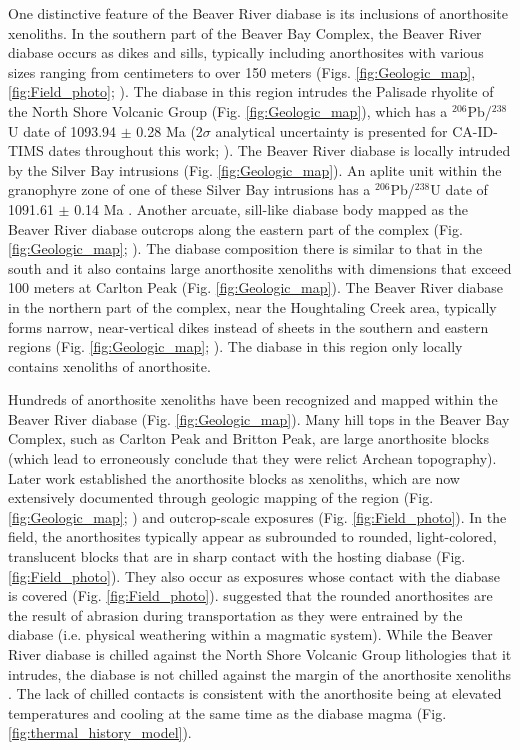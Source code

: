 \documentclass[draft]{agujournal2019}
\begin{document}
One distinctive feature of the Beaver River diabase is its inclusions of anorthosite xenoliths. In the southern part of the Beaver Bay Complex, the Beaver River diabase occurs as dikes and sills, typically including anorthosites with various sizes ranging from centimeters to over 150 meters (Figs. \ref{fig:Geologic_map}, \ref{fig:Field_photo}; ). The diabase in this region intrudes the Palisade rhyolite of the North Shore Volcanic Group (Fig. \ref{fig:Geologic_map}), which has a $^{206}$Pb/$^{238}$U date of 1093.94 $\pm$ 0.28 Ma (2$\sigma$ analytical uncertainty is presented for CA-ID-TIMS dates throughout this work; ). The Beaver River diabase is locally intruded by the Silver Bay intrusions (Fig. \ref{fig:Geologic_map}). An aplite unit within the granophyre zone of one of these Silver Bay intrusions has a $^{206}$Pb/$^{238}$U date of 1091.61 $\pm$ 0.14 Ma \cite{Swanson-Hysell2019a}. Another arcuate, sill-like diabase body mapped as the Beaver River diabase outcrops along the eastern part of the complex (Fig. \ref{fig:Geologic_map}; ). The diabase composition there is similar to that in the south and it also contains large anorthosite xenoliths with dimensions that exceed 100 meters at Carlton Peak (Fig. \ref{fig:Geologic_map}). The Beaver River diabase in the northern part of the complex, near the Houghtaling Creek area, typically forms narrow, near-vertical dikes instead of sheets in the southern and eastern regions (Fig. \ref{fig:Geologic_map}; ). The diabase in this region only locally contains xenoliths of anorthosite. 

Hundreds of anorthosite xenoliths have been recognized and mapped within the Beaver River diabase (Fig. \ref{fig:Geologic_map}). Many hill tops in the Beaver Bay Complex, such as Carlton Peak and Britton Peak, are large anorthosite blocks (which lead  to erroneously conclude that they were relict Archean topography). Later work established the anorthosite blocks as xenoliths, which are now extensively documented through geologic mapping of the region (Fig. \ref{fig:Geologic_map}; ) and outcrop-scale exposures (Fig. \ref{fig:Field_photo}). In the field, the anorthosites typically appear as subrounded to rounded, light-colored, translucent blocks that are in sharp contact with the hosting diabase (Fig. \ref{fig:Field_photo}). They also occur as exposures whose contact with the diabase is covered (Fig. \ref{fig:Field_photo}).  suggested that the rounded anorthosites are the result of abrasion during transportation as they were entrained by the diabase (i.e. physical weathering within a magmatic system). While the Beaver River diabase is chilled against the North Shore Volcanic Group lithologies that it intrudes, the diabase is not chilled against the margin of the anorthosite xenoliths \cite{Morrison1983a, Miller1997a}. The lack of chilled contacts is consistent with the anorthosite being at elevated temperatures and cooling at the same time as the diabase magma (Fig. \ref{fig:thermal_history_model}).
\end{document}
